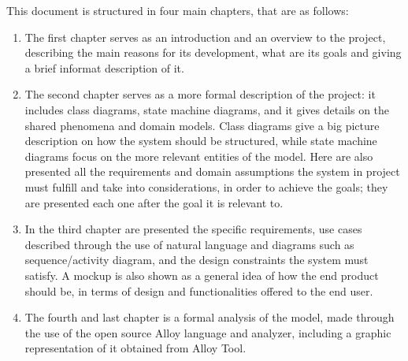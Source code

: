 \documentclass[../main.tex]{subfiles}
\begin{document}
This document is structured in four main chapters, that are as follows:

\begin{enumerate}
	\item The first chapter serves as an introduction and an overview to the project, describing the main reasons for its development, what are its goals and giving a brief informat description of it.

	\item The second chapter serves as a more formal description of the project: it includes class diagrams, state machine diagrams, and it gives details on the shared phenomena and domain models. Class diagrams give a big picture description on how the system should be structured, while state machine diagrams focus on the more relevant entities of the model. Here are also presented all the requirements and domain assumptions the system in project must fulfill and take into considerations, in order to achieve the goals; they are presented each one after the goal it is relevant to.

	\item In the third chapter are presented the specific requirements, use cases described through the use of natural language and diagrams such as sequence/activity diagram, and the design constraints the system must satisfy. A mockup is also shown as a general idea of how the end product should be, in terms of design and functionalities offered to the end user.

	\item The fourth and last chapter is a formal analysis of the model, made through the use of the open source Alloy language and analyzer, including a graphic representation of it obtained from Alloy Tool.
\end{enumerate}
\end{document}
